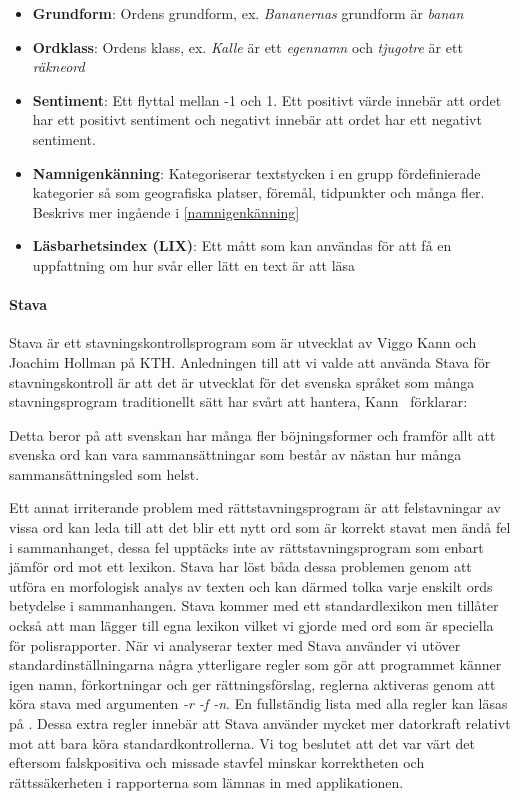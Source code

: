 \documentclass[swedish]{maucsthesis}
\begin{document}
\begin{itemize}
\item \textbf{Grundform}: Ordens grundform, ex. \textit{Bananernas} grundform är
  \textit{banan}
\item \textbf{Ordklass}: Ordens klass, ex. \textit{Kalle} är ett
  \textit{egennamn} och \textit{tjugotre} är ett \textit{räkneord}
\item \textbf{Sentiment}: Ett flyttal mellan -1 och 1. Ett positivt värde innebär att ordet har ett positivt sentiment och negativt innebär att ordet har ett negativt sentiment.
\item \textbf{Namnigenkänning}: Kategoriserar textstycken i en grupp
  fördefinierade kategorier så som geografiska platser, föremål, tidpunkter och
  många fler. Beskrivs mer ingående i \cref{namnigenkänning}
\item \textbf{Läsbarhetsindex (LIX)}: Ett mått som kan användas för att få en
  uppfattning om hur svår eller lätt en text är att läsa
\end{itemize}

\paragraph*{Stava}\label{stava}
Stava \cite{kann:2016} är ett stavningskontrollsprogram som är utvecklat av Viggo Kann och
Joachim Hollman på KTH. Anledningen till att vi valde att använda Stava för
stavningskontroll är att det är utvecklat för det svenska språket som många
stavningsprogram traditionellt sätt har svårt att hantera, Kann~\cite{kann:1997}
förklarar:

\begin{displayquote}
  Detta beror på att svenskan har många fler böjningsformer och framför allt att
  svenska ord kan vara sammansättningar som består av nästan hur många
  sammansättningsled som helst.
\end{displayquote}

Ett annat irriterande problem med rättstavningsprogram är att felstavningar av
vissa ord kan leda till att det blir ett nytt ord som är korrekt stavat men ändå
fel i sammanhanget, dessa fel upptäcks inte av rättstavningsprogram som enbart
jämför ord mot ett lexikon. Stava har löst båda dessa problemen genom att utföra
en morfologisk analys av texten och kan därmed tolka varje enskilt ords
betydelse i sammanhangen. Stava kommer med ett standardlexikon men tillåter
också att man lägger till egna lexikon vilket vi gjorde med ord som är speciella
för polisrapporter. När vi analyserar texter med Stava använder vi utöver
standardinställningarna några ytterligare regler som gör att programmet känner igen
namn, förkortningar och ger rättningsförslag, reglerna aktiveras genom att köra stava med 
argumenten \textit{-r -f -n}. En fullständig lista med alla regler kan läsas på \cite{kann:2016}. Dessa extra regler innebär att
Stava använder mycket mer datorkraft relativt mot att bara köra
standardkontrollerna. Vi tog beslutet att det var värt det eftersom
falskpositiva och missade stavfel minskar korrektheten och rättssäkerheten i
rapporterna som lämnas in med applikationen. 
\end{document}
